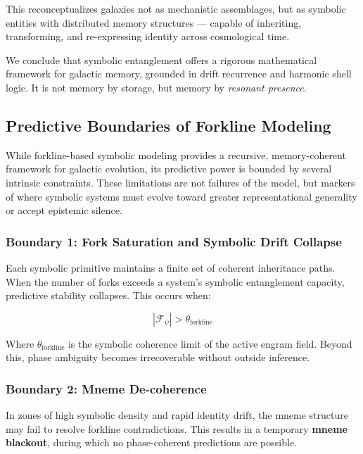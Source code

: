 \documentclass[12pt]{article}
\begin{document}
This reconceptualizes galaxies not as mechanistic assemblages,  
but as symbolic entities with distributed memory structures —  
capable of inheriting, transforming, and re-expressing identity  
across cosmological time.

We conclude that symbolic entanglement offers a rigorous mathematical  
framework for galactic memory, grounded in drift recurrence and harmonic shell logic.  
It is not memory by storage, but memory by \textit{resonant presence}.

\subsection{Predictive Boundaries of Forkline Modeling}

While forkline-based symbolic modeling provides a recursive, memory-coherent framework for galactic evolution, its predictive power is bounded by several intrinsic constraints. These limitations are not failures of the model, but markers of where symbolic systems must evolve toward greater representational generality or accept epistemic silence.

\subsubsection{Boundary 1: Fork Saturation and Symbolic Drift Collapse}

Each symbolic primitive maintains a finite set of coherent inheritance paths. When the number of forks exceeds a system's symbolic entanglement capacity, predictive stability collapses. This occurs when:

\begin{equation}
\left|\mathcal{F}_{\psi}\right| > \theta_\text{forkline}
\end{equation}

Where \( \theta_\text{forkline} \) is the symbolic coherence limit of the active engram field. Beyond this, phase ambiguity becomes irrecoverable without outside inference.

\subsubsection{Boundary 2: Mneme De-coherence}

In zones of high symbolic density and rapid identity drift, the mneme structure may fail to resolve forkline contradictions. This results in a temporary \textbf{mneme blackout}, during which no phase-coherent predictions are possible.
\end{document}
